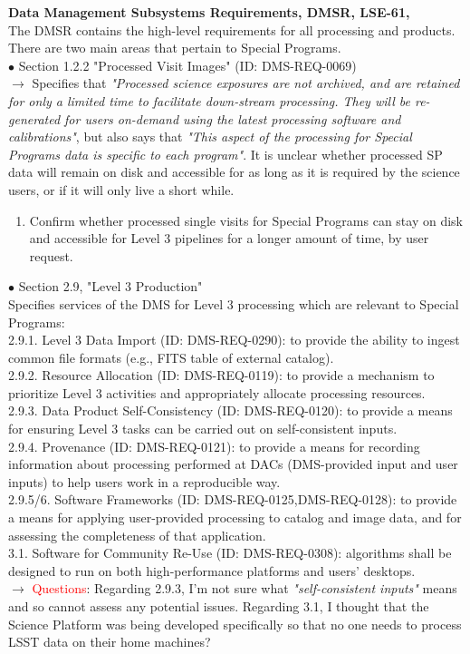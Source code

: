 \documentclass[DM,lsstdraft,toc]{lsstdoc}
\begin{document}
\noindent \textbf{Data Management Subsystems Requirements, DMSR, LSE-61, \cite{LSE-61}} \\
The DMSR contains the high-level requirements for all processing and products. There are two main areas that pertain to Special Programs. \\
$\bullet$ Section 1.2.2 "Processed Visit Images" (ID: DMS-REQ-0069)\\
$\rightarrow$ Specifies that {\it "Processed science exposures are not archived, and are retained for only a limited time to facilitate down-stream processing. They will be re-generated for users on-demand using the latest processing software and calibrations"}, but also says that {\it "This aspect of the processing for Special Programs data is specific to each program"}. It is unclear whether processed SP data will remain on disk and accessible for as long as it is required by the science users, or if it will only live a short while.
\begin{enumerate}[topsep=-10pt,label= \textbf{Action \Roman*.},resume] \item Confirm whether processed single visits for Special Programs can stay on disk and accessible for Level 3 pipelines for a longer amount of time, by user request. \end{enumerate}
$\bullet$ Section 2.9, "Level 3 Production" \\
Specifies services of the DMS for Level 3 processing which are relevant to Special Programs: \\
2.9.1. Level 3 Data Import (ID: DMS-REQ-0290): to provide the ability to ingest common file formats (e.g., FITS table of external catalog). \\
2.9.2. Resource Allocation (ID: DMS-REQ-0119): to provide a mechanism to prioritize Level 3 activities and appropriately allocate processing resources. \\
2.9.3. Data Product Self-Consistency (ID: DMS-REQ-0120): to provide a means for ensuring Level 3 tasks can be carried out on self-consistent inputs. \\
2.9.4. Provenance (ID: DMS-REQ-0121): to provide a means for recording information about processing performed at DACs (DMS-provided input and user inputs) to help users work in a reproducible way. \\
2.9.5/6. Software Frameworks (ID: DMS-REQ-0125,DMS-REQ-0128): to provide a means for applying user-provided processing to catalog and image data, and for assessing the completeness of that application. \\
3.1. Software for Community Re-Use (ID: DMS-REQ-0308): algorithms shall be designed to run on both high-performance platforms and users' desktops. \\
$\rightarrow$ \textcolor{red}{Questions}: Regarding 2.9.3, I'm not sure what {\it "self-consistent inputs"} means and so cannot assess any potential issues. Regarding 3.1, I thought that the Science Platform was being developed specifically so that no one needs to process LSST data on their home machines?
\end{document}
